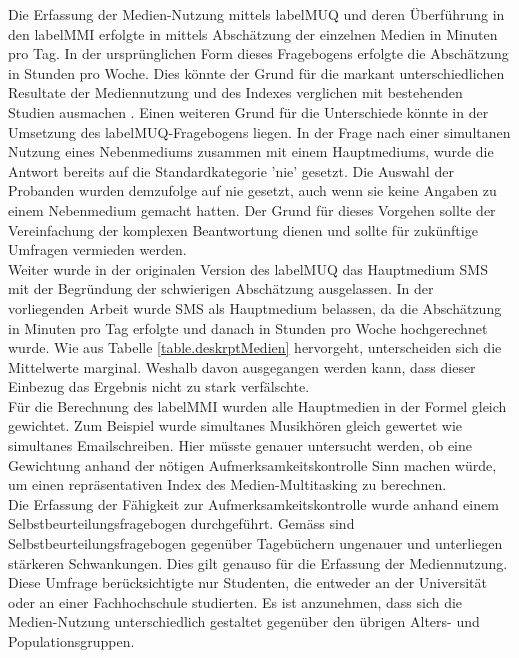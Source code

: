 \label{section.diskussion.methodenkritik}
Die Erfassung der Medien-Nutzung mittels \gls{labelMUQ} und deren Überführung in den \gls{labelMMI} erfolgte in mittels Abschätzung der einzelnen Medien in Minuten pro Tag. In der ursprünglichen Form dieses Fragebogens erfolgte die Abschätzung in Stunden pro Woche. Dies könnte der Grund für die markant unterschiedlichen Resultate der Mediennutzung und des Indexes verglichen mit bestehenden Studien ausmachen \cite{Ophir2009,Alzahabi2013}. Einen weiteren Grund für die Unterschiede könnte in der Umsetzung des \gls{labelMUQ}-Fragebogens liegen. In der Frage nach einer simultanen Nutzung eines Nebenmediums zusammen mit einem Hauptmediums, wurde die Antwort bereits auf die Standardkategorie 'nie' gesetzt. Die Auswahl der Probanden wurden demzufolge auf nie gesetzt, auch wenn sie keine Angaben zu einem Nebenmedium gemacht hatten. Der Grund für dieses Vorgehen sollte der Vereinfachung der komplexen Beantwortung dienen und sollte für zukünftige Umfragen vermieden werden.\\
Weiter wurde in der originalen Version des \gls{labelMUQ} das Hauptmedium SMS mit der Begründung der schwierigen Abschätzung ausgelassen. In der vorliegenden Arbeit wurde SMS als Hauptmedium belassen, da die Abschätzung in Minuten pro Tag erfolgte und danach in Stunden pro Woche hochgerechnet wurde.  Wie aus Tabelle \ref{table.deskrptMedien} hervorgeht, unterscheiden sich die Mittelwerte marginal. Weshalb davon ausgegangen werden kann, dass dieser Einbezug das Ergebnis nicht zu stark verfälschte.\\
Für die Berechnung des \gls{labelMMI} wurden alle Hauptmedien in der Formel gleich gewichtet. Zum Beispiel wurde simultanes Musikhören gleich gewertet wie simultanes Emailschreiben. Hier müsste genauer untersucht werden, ob eine Gewichtung anhand der nötigen Aufmerksamkeitskontrolle Sinn machen würde, um einen repräsentativen Index des Medien-Multitasking zu berechnen.\\
Die Erfassung der Fähigkeit zur Aufmerksamkeitskontrolle wurde anhand einem Selbstbeurteilungsfragebogen durchgeführt. Gemäss  sind Selbstbeurteilungsfragebogen gegenüber Tagebüchern ungenauer und unterliegen stärkeren Schwankungen. Dies gilt genauso für die Erfassung der Mediennutzung.\\
Diese Umfrage berücksichtigte nur Studenten, die entweder an der Universität oder an einer Fachhochschule studierten. Es ist anzunehmen, dass sich die Medien-Nutzung unterschiedlich gestaltet gegenüber den übrigen Alters- und Populationsgruppen. 
